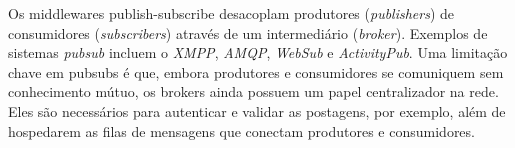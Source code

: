 \documentclass[12pt]{article}
\newcommand{\FC} {Freechains\xspace}
\begin{document}


Os middlewares publish-subscribe desacoplam produtores (\emph{publishers}) de
consumidores (\emph{subscribers}) através de um intermediário (\emph{broker}).
Exemplos de sistemas \emph{pubsub} incluem o \emph{XMPP}, \emph{AMQP},
\emph{WebSub} e \emph{ActivityPub}.
Uma limitação chave em pubsubs é que, embora produtores e consumidores
se comuniquem sem conhecimento mútuo, os brokers ainda possuem um papel
centralizador na rede.
Eles são necessários para autenticar e validar as postagens, por exemplo, além
de hospedarem as filas de mensagens que conectam produtores e consumidores.

\end{document}

